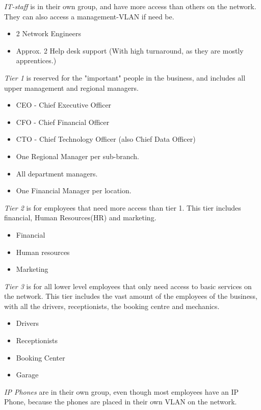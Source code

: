 \emph{IT-staff} is in their own group, and have more access than others on the network.
They can also access a management-VLAN if need be.
\begin{itemize}[noitemsep]
    \item 2 Network Engineers
    \item Approx. 2 Help desk support (With high turnaround, as they are mostly apprentices.)

\end{itemize}

\hfill

\emph{Tier 1} is reserved for the "important" people in the business, and includes all upper management and regional managers.
\begin{itemize}[noitemsep]
    \item CEO - Chief Executive Officer
    \item CFO - Chief Financial Officer
    \item CTO - Chief Technology Officer (also Chief Data Officer)
    \item One Regional Manager per sub-branch.
    \item All department managers.
    \item One Financial Manager per location.
\end{itemize}

\hfill

\emph{Tier 2} is for employees that need more access than tier 1. This tier includes financial, Human Resources(HR) and marketing.
\begin{itemize}[noitemsep]
    \item Financial
    \item Human resources
    \item Marketing
\end{itemize}

\hfill

\emph{Tier 3} is for all lower level employees that only need access to basic services on the network. This tier includes the vast amount of the employees of the business, with all the drivers, receptionists, the booking centre and mechanics.
\begin{itemize}
    \item Drivers
    \item Receptionists
    \item Booking Center
    \item Garage
\end{itemize}

\emph{IP Phones} are in their own group, even though most employees have an IP Phone, because the phones are placed in their own VLAN on the network.


